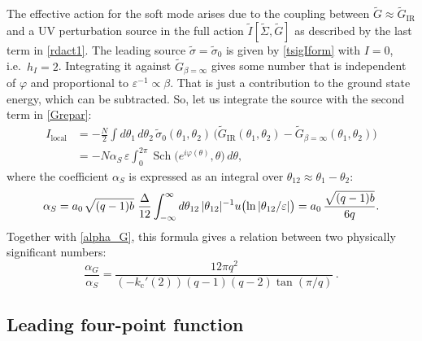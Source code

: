 \documentclass[12pt]{article}
\DeclareMathOperator{\Sch}{Sch}
\newcommand{\cc}{\mathrm{c}}
\newcommand{\loc}{\text{local}}
\newcommand{\IR}{\text{IR}}
\newcommand{\tI}{\tilde{I}}
\newcommand{\tG}{\widetilde{G}}
\newcommand{\tSig}{\widetilde{\Sigma}}
\newcommand{\tsig}{\tilde{\sigma}}
\newcommand{\vep}{\varepsilon}
\newcommand{\vp}{\varphi}
\def\ie{i.e.\ }
\begin{document}
The effective action for the soft mode arises due to the coupling between $\tG\approx\tG_{\IR}$ and a UV perturbation source in the full action $\tI[\tSig,\tG]$ as described by the last term in \eqref{rdact1}. The leading source $\tsig=\tsig_0$ is given by \eqref{tsigIform} with $I=0$, \ie $h_I=2$. Integrating it against $\tG_{\beta=\infty}$  gives some number that is independent of $\vp$ and proportional to $\vep^{-1}\propto\beta$. That is just a contribution to the ground state energy, which can be subtracted. So, let us integrate the source with the second term in \eqref{Grepar}:
\begin{equation}\label{Schwarz_2}
\begin{aligned}
I_{\loc}&=-\frac{N}{2}\int d\theta_1\,d\theta_2\,\tsig_{0}(\theta_1,\theta_2)\,
\bigl(\tG_{\IR}(\theta_1,\theta_2)-\tG_{\beta=\infty}(\theta_1,\theta_2)\bigr)
\\[3pt]
&=-N\alpha_{S}\,\vep \int_{0}^{2\pi}
\Sch\bigl(e^{i\vp(\theta)},\theta\bigr)\,d\theta,
\end{aligned}
\end{equation}
where the coefficient $\alpha_S$ is expressed as an integral over $\theta_{12}\approx\theta_1-\theta_2$:
\begin{equation}
\alpha_{S}=a_{0}\kern1pt \sqrt{(q-1)b}\kern3pt \frac{\Delta}{12}
\int_{-\infty}^{\infty}d\theta_{12}\,|\theta_{12}|^{-1}
u\bigl(\ln|\theta_{12}/\vep|\bigr)
=a_{0}\,\frac{\sqrt{(q-1)b}}{6q}.
\end{equation}
Together with \eqref{alpha_G}, this formula gives a relation between two physically significant numbers:
\begin{equation}
\frac{\alpha_G}{\alpha_S}
=\frac{12\pi q^2}{(-k_{\cc}'(2))(q-1)(q-2)\tan(\pi/q)}\,.
\end{equation}

\subsection{Leading four-point function}
\end{document}
